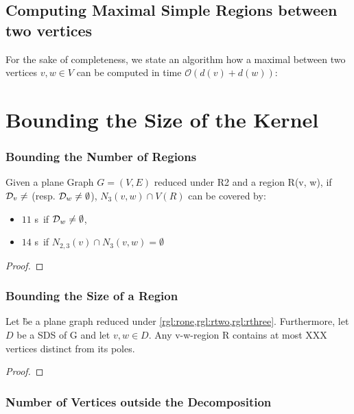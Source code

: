 \subsection{Computing Maximal Simple Regions between two vertices}

For the sake of completeness, we state an algorithm how a maximal \sr between two vertices $v,w \in V$ can be computed in time $\mathcal{O}(d(v) + d(w))$:

\section{Bounding the Size of the Kernel}

\subsubsection{Bounding the Number of Regions}

\begin{lemma}
   Given a plane Graph $G = (V,E)$ reduced under R2 and a region R(v, w), if $\mathcal{D}_{v} \neq $ (resp. $\mathcal{D}_{w} \neq \emptyset$), $N_3(v,w) \cap V(R)$ can be covered by: 
   \begin{itemize}
    \item $11$ \sr s~if $\mathcal{D}_{w} \neq \emptyset$, 
    \item $14$ \sr s~if $N_{2,3}(v) \cap N_3(v,w) = \emptyset$
   \end{itemize}
\end{lemma}

\begin{proof} 
\end{proof}

\subsubsection{Bounding the Size of a Region}

\begin{lemma}
    Let \G be a plane graph reduced under \cref{rgl:rone,rgl:rtwo,rgl:rthree}. Furthermore, let $D$ be a SDS of G and let $v,w \in D$. Any v-w-region R contains at most XXX vertices distinct from its poles.
\end{lemma}
\begin{proof} 
\end{proof}

\subsubsection{Number of Vertices outside the Decomposition}


